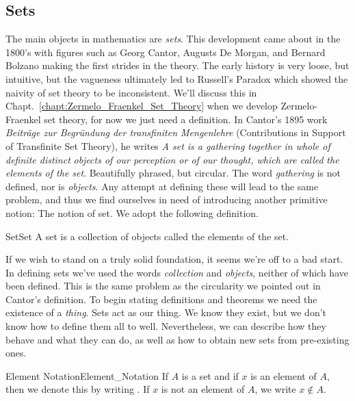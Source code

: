     \subsection{Sets}
        The main objects in mathematics are \textit{sets}. This development came
        about in the 1800's with figures such as Georg
        Cantor, Augusts De
        Morgan, and Bernard
        Bolzano making the first strides in the theory.
        The early history is very loose, but intuitive, but the vagueness
        ultimately led to Russell's Paradox which
        showed the naivity of set theory to be inconsistent. We'll discuss this
        in Chapt.~\ref{chapt:Zermelo_Fraenkel_Set_Theory} when we develop
        Zermelo-Fraenkel set theory, for now we just need a definition. In
        Cantor's 1895 work
        \textit{Beitr\"{a}ge zur Begr\"{u}ndung der transfiniten Mengenlehre}
        (Contributions in Support of Transfinite Set Theory), he writes
        \textit{A set is a gathering together in whole of definite distinct}
        \textit{objects of our perception or of our thought, which are called}
        \textit{the elements of the set}. Beautifully phrased, but circular. The
        word \textit{gathering} is not defined, nor is \textit{objects}. Any
        attempt at defining these will lead to the same problem, and thus we
        find ourselves in need of introducing another primitive notion: The
        notion of set. We adopt the following definition.
        \begin{fdefinition}{Set}{Set}
            A \gls{set} is a collection of objects called the elements of the
            set.
        \end{fdefinition}
        If we wish to stand on a truly solid foundation, it seems we're off to a
        bad start. In defining sets we've used the words \textit{collection} and
        \textit{objects}, neither of which have been defined. This is the same
        problem as the circularity we pointed out in Cantor's definition. To
        begin stating definitions and theorems we need the existence of a
        \textit{thing}. Sets act as our thing. We know they exist, but we don't
        know how to define them all to well. Nevertheless, we can describe how
        they behave and what they can do, as well as how to obtain new sets from
        pre-existing ones.
        \begin{fnotation}{Element Notation}{Element_Notation}
            If $A$ is a \gls{set} and if $x$ is an element
            of $A$, then we denote this by writing
            . If $x$ is not an element
            of $A$, we write $x\notin{A}$.
        \end{fnotation}
